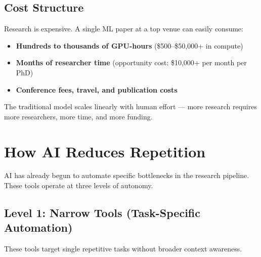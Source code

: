 \documentclass[11pt,a4paper]{article}
\begin{document}
\subsection{Cost Structure}

Research is expensive. A single ML paper at a top venue can easily consume:
\begin{itemize}[leftmargin=2em]
    \item \textbf{Hundreds to thousands of GPU-hours} (\$500--\$50,000+ in compute)
    \item \textbf{Months of researcher time} (opportunity cost: \$10,000+ per month per PhD)
    \item \textbf{Conference fees, travel, and publication costs}
\end{itemize}
The traditional model scales linearly with human effort --- more research requires more researchers, more time, and more funding.

\section{How AI Reduces Repetition}

AI has already begun to automate specific bottlenecks in the research pipeline. These tools operate at three levels of autonomy.

\subsection{Level 1: Narrow Tools (Task-Specific Automation)}

These tools target single repetitive tasks without broader context awareness.
\end{document}
